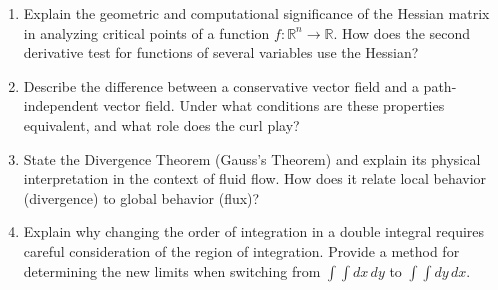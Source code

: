 \documentclass[11pt]{article}
\begin{document}
\begin{enumerate}[label=\textbf{\arabic*.}]
  \item Explain the geometric and computational significance of the Hessian matrix in analyzing 
  critical points of a function $f: \mathbb{R}^n \to \mathbb{R}$. How does the second derivative 
  test for functions of several variables use the Hessian?

  \item Describe the difference between a conservative vector field and a path-independent vector 
  field. Under what conditions are these properties equivalent, and what role does the curl play?

  \item State the Divergence Theorem (Gauss's Theorem) and explain its physical interpretation in 
  the context of fluid flow. How does it relate local behavior (divergence) to global behavior (flux)?

  \item Explain why changing the order of integration in a double integral requires careful 
  consideration of the region of integration. Provide a method for determining the new limits 
  when switching from $\int \int dx\,dy$ to $\int \int dy\,dx$.

\end{enumerate}
\end{document}
